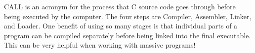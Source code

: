 \begin{blocksection}
CALL is an acronym for the process that C source code goes through before being executed by the computer. The four steps are Compiler, Assembler, Linker, and Loader. 
One benefit of using so many stages is that individual parts of a program can be compiled separately before being linked into the final executable. 
This can be very helpful when working with massive programs!


\end{blocksection}
